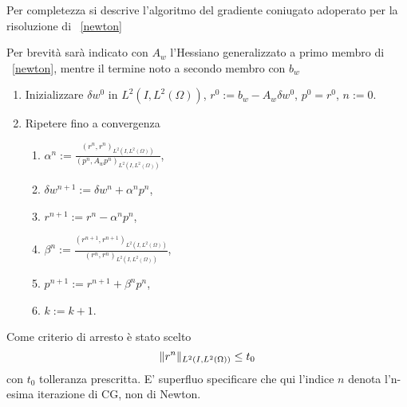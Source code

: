 Per completezza si descrive l'algoritmo del gradiente coniugato adoperato per la risoluzione di ~\eqref{newton}
\begin{algoritmo}
\label{cg}
Per brevità sarà indicato con $ A_w $ l'Hessiano generalizzato a primo membro di ~\eqref{newton}, mentre il termine noto a secondo membro con $ b_w $
\begin{enumerate}
\item Inizializzare $ \delta w^0 $ in $ L^2(I,L^2(\Omega)) $, $ r^0:=b_w-A_w\delta w^0 $, $ p^0=r^0 $, $ n:=0 $.
\item Ripetere fino a convergenza
          \begin{enumerate} 
          \item $\alpha^n:=\frac{(r^n,r^n)_{L^2(I,L^2(\Omega))}}{(p^n,A_wp^n)_{L^2(I,L^2(\Omega))}}$,
          \item $\delta w^{n+1}:=\delta w^n + \alpha^np^n$,
          \item $r^{n+1}:=r^n-\alpha^np^n$,
          \item $\beta^n:=\frac{(r^{n+1},r^{n+1})_{L^2(I,L^2(\Omega))}}{(r^n,r^n)_{L^2(I,L^2(\Omega))}}$,
          \item $p^{n+1}:=r^{n+1} + \beta^np^n$,
          \item $k:=k+1$.
          \end{enumerate}
\end{enumerate}
Come criterio di arresto è stato scelto 
\begin{equation}
\lVert r^n\rVert_{L^2(I,L^2(\Omega))}\le t_0 
\label{eq:CGtoll}
\end{equation}
con $ t_0 $ tolleranza prescritta.
E' superfluo specificare che qui l'indice $ n $ denota l'n-esima iterazione di CG, non di Newton.
\label{CG}
\end{algoritmo} 